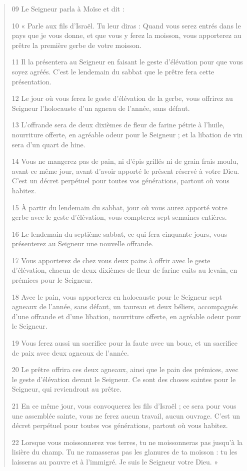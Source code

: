 \begin{quote}
09 Le Seigneur parla à Moïse et dit :

10 « Parle aux fils d’Israël. Tu leur diras : Quand vous serez entrés dans le pays que je vous donne, et que vous y ferez la moisson, vous apporterez au prêtre la première gerbe de votre moisson.

11 Il la présentera au Seigneur en faisant le geste d’élévation pour que vous soyez agréés. C’est le lendemain du sabbat que le prêtre fera cette présentation.

12 Le jour où vous ferez le geste d’élévation de la gerbe, vous offrirez au Seigneur l’holocauste d’un agneau de l’année, sans défaut.

13 L’offrande sera de deux dixièmes de fleur de farine pétrie à l’huile, nourriture offerte, en agréable odeur pour le Seigneur ; et la libation de vin sera d’un quart de hine.

14 Vous ne mangerez pas de pain, ni d’épis grillés ni de grain frais moulu, avant ce même jour, avant d’avoir apporté le présent réservé à votre Dieu. C’est un décret perpétuel pour toutes vos générations, partout où vous habitez.

15 À partir du lendemain du sabbat, jour où vous aurez apporté votre gerbe avec le geste d’élévation, vous compterez sept semaines entières.

16 Le lendemain du septième sabbat, ce qui fera cinquante jours, vous présenterez au Seigneur une nouvelle offrande.

17 Vous apporterez de chez vous deux pains à offrir avec le geste d’élévation, chacun de deux dixièmes de fleur de farine cuits au levain, en prémices pour le Seigneur.

18 Avec le pain, vous apporterez en holocauste pour le Seigneur sept agneaux de l’année, sans défaut, un taureau et deux béliers, accompagnés d’une offrande et d’une libation, nourriture offerte, en agréable odeur pour le Seigneur.

19 Vous ferez aussi un sacrifice pour la faute avec un bouc, et un sacrifice de paix avec deux agneaux de l’année.

20 Le prêtre offrira ces deux agneaux, ainsi que le pain des prémices, avec le geste d’élévation devant le Seigneur. Ce sont des choses saintes pour le Seigneur, qui reviendront au prêtre.

21 En ce même jour, vous convoquerez les fils d’Israël ; ce sera pour vous une assemblée sainte, vous ne ferez aucun travail, aucun ouvrage. C’est un décret perpétuel pour toutes vos générations, partout où vous habitez.

22 Lorsque vous moissonnerez vos terres, tu ne moissonneras pas jusqu’à la lisière du champ. Tu ne ramasseras pas les glanures de ta moisson : tu les laisseras au pauvre et à l’immigré. Je suis le Seigneur votre Dieu. »
\end{quote}

